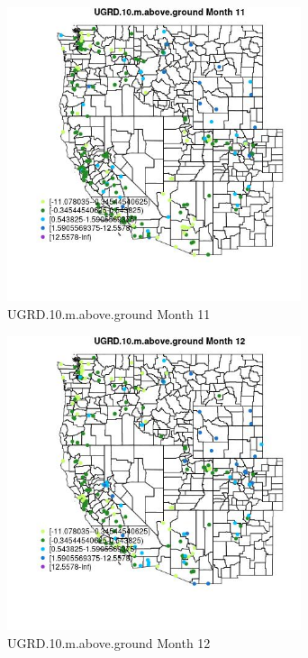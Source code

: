 \begin{figure} 
\centering  
\includegraphics[width=0.77\textwidth]{Code_Outputs/Report_ML_input_PM25_Step4_part_e_de_duplicated_aveswNAs_MapObsMo11UGRD10maboveground.jpg} 
\caption{\label{fig:Report_ML_input_PM25_Step4_part_e_de_duplicated_aveswNAsMapObsMo11UGRD10maboveground}UGRD.10.m.above.ground Month 11} 
\end{figure} 
 

\begin{figure} 
\centering  
\includegraphics[width=0.77\textwidth]{Code_Outputs/Report_ML_input_PM25_Step4_part_e_de_duplicated_aveswNAs_MapObsMo12UGRD10maboveground.jpg} 
\caption{\label{fig:Report_ML_input_PM25_Step4_part_e_de_duplicated_aveswNAsMapObsMo12UGRD10maboveground}UGRD.10.m.above.ground Month 12} 
\end{figure} 
 

